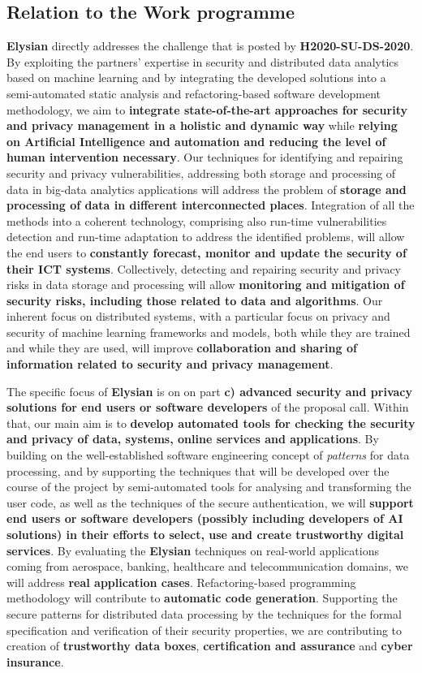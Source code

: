 \documentclass[a4paper,11pt]{article}
\newcommand{\project}[1]{\textbf{#1}\xspace}
\newcommand{\SECURITY}{\project{Elysian}}
\newcommand{\TheProject}{\SECURITY}
\begin{document}
\subsection{Relation to the Work programme}

\TheProject{} directly addresses the challenge that is posted by \textbf{H2020-SU-DS-2020}. By exploiting the partners' expertise in security and distributed data analytics based on machine learning and by integrating the developed solutions into a semi-automated static analysis and refactoring-based software development methodology, we aim to \textbf{integrate state-of-the-art approaches for security and privacy management in a holistic and dynamic way} while \textbf{relying on Artificial Intelligence and automation and reducing the level of human intervention necessary}. Our techniques for identifying and repairing security and privacy vulnerabilities, addressing both storage and processing of data in big-data analytics applications will address the problem of \textbf{storage and processing of data in different interconnected places}. Integration of all the methods into a coherent technology, comprising also run-time vulnerabilities detection and run-time adaptation to address the identified problems, will allow the end users to  \textbf{constantly forecast, monitor and update the security of their ICT systems}. Collectively, detecting and repairing security and privacy risks in data storage and processing will allow \textbf{monitoring and mitigation of security risks, including those related to data and algorithms}. Our inherent focus on distributed systems, with a particular focus on privacy and security of machine learning frameworks and models, both while they are trained and while they are used, will improve \textbf{collaboration and sharing of information related to security and privacy management}. 

The specific focus of \TheProject{} is on on part \textbf{c) advanced security and privacy solutions for end users or software developers} of the proposal call. Within that, our main aim is to \textbf{develop automated tools for checking the security and privacy of data, systems, online services and applications}. By building on the well-established software engineering concept of \emph{patterns} for data processing, and by supporting the techniques that will be developed over the course of the project by semi-automated tools for analysing and transforming the user code, as well as the techniques of the secure authentication, we will \textbf{support end users or software developers (possibly including developers of AI solutions) in their efforts to select, use and create trustworthy digital services}. By evaluating the \TheProject{} techniques on real-world applications coming from aerospace, banking, healthcare and telecommunication domains, we will address \textbf{real application cases}. Refactoring-based programming methodology will contribute to \textbf{automatic code generation}. Supporting the secure patterns for distributed data processing by the techniques for the formal specification and verification of their security properties, we are contributing to creation of \textbf{trustworthy data boxes}, \textbf{certification and assurance} and \textbf{cyber insurance}.
\end{document}
